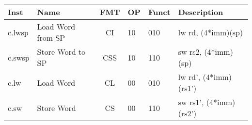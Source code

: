 \begin{center}
\begin{tabular}
{| T | l | c | T | T | T |} \hline
\rmfamily Inst   & Name                    & FMT & \rmfamily OP & \rmfamily Funct & \rmfamily Description          \\ \hline
c.lwsp     & Load Word from SP       & CI  & 10     & 010       & lw rd, (4*imm)(sp)       \\
c.swsp     & Store Word to SP        & CSS & 10     & 110       & sw rs2, (4*imm)(sp)      \\
c.lw       & Load Word               & CL  & 00     & 010       & lw rd', (4*imm)(rs1')    \\
c.sw       & Store Word              & CS  & 00     & 110       & sw rs1', (4*imm)(rs2')    \\

\end{tabular}
\end{center}
